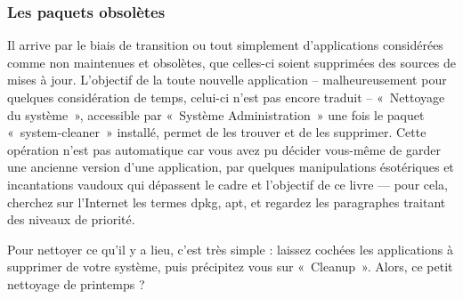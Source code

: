 {\subsubsection{Les paquets obsolètes}
\label{RefCleaner}
Il arrive par le biais de transition ou tout simplement d'applications considérées comme non maintenues et obsolètes, que celles-ci soient supprimées des sources de mises à jour. L'objectif de la toute nouvelle application -- malheureusement pour quelques considération de temps, celui-ci n'est pas encore traduit -- «~Nettoyage du système~», accessible par «~Système \FlecheDroite Administration~» une fois le paquet «~system-cleaner~» installé, permet de les trouver et de les supprimer. Cette opération n'est pas automatique car vous avez pu décider vous-même de garder une ancienne version d'une application, par quelques manipulations ésotériques et incantations vaudoux qui dépassent le cadre et l'objectif de ce livre --- pour cela, cherchez sur l'Internet les termes dpkg, apt, et regardez les paragraphes traitant des niveaux de priorité.\par
Pour nettoyer ce qu'il y a lieu, c'est très simple : laissez cochées les applications à supprimer de votre système, puis précipitez vous sur «~Cleanup~». Alors, ce petit nettoyage de printemps ?
}
